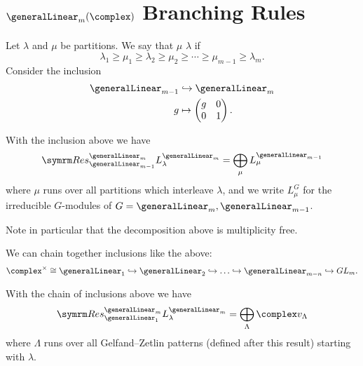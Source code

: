 \section{\texorpdfstring{\(\generalLinear_m(\complex)\)}{GLm} Branching Rules}
Let \(\lambda\) and \(\mu\) be partitions.
We say that \(\mu\)  \(\lambda\) if
\begin{equation}
    \lambda_1 \ge \mu_1 \ge \lambda_2 \ge \mu_2 \ge \dotsb \ge \mu_{m-1} \ge \lambda_m.
\end{equation}
Consider the inclusion
\begin{equation}
    \begin{aligned}
        \generalLinear_{m-1} &\hookrightarrow \generalLinear_m\\
        g & \mapsto
        \begin{pmatrix}
            g & 0\\
            0 & 1
        \end{pmatrix}
        .
    \end{aligned}
\end{equation}

\begin{prp}{}{}
    With the inclusion above we have
    \begin{equation}
        \Res^{\generalLinear_m}_{\generalLinear_{m-1}} L_\lambda^{\generalLinear_m} = \bigoplus_\mu L_\mu^{\generalLinear_{m-1}}
    \end{equation}
    where \(\mu\) runs over all partitions which interleave \(\lambda\), and we write \(L_\mu^G\) for the irreducible \(G\)-modules of \(G = \generalLinear_m, \generalLinear_{m-1}\).
\end{prp}

Note in particular that the decomposition above is multiplicity free.

We can chain together inclusions like the above:
\begin{equation}
    \complex^{\times} \isomorphic \generalLinear_1 \hookrightarrow \generalLinear_2 \hookrightarrow \dotso \hookrightarrow\generalLinear_{m-n} \hookrightarrow GL_m.
\end{equation}

\begin{crl}{}{}
    With the chain of inclusions above we have
    \begin{equation}
        \Res^{\generalLinear_m}_{\generalLinear_1} L_\lambda^{\generalLinear_m} = \bigoplus_\Lambda \complex v_\Lambda
    \end{equation}
    where \(\Lambda\) runs over all Gelfand--Zetlin patterns (defined after this result) starting with \(\lambda\).
\end{crl}

